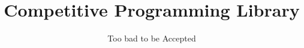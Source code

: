 \documentclass[a4paper]{article}
\title{Competitive Programming Library}
\author{Too bad to be Accepted}
\date{ }
\newcommand{\inculdeSubFile}[1]{\newpage}
\begin{document}
	\maketitle
	\tableofcontents
	\newpage

	\inculdeSubFile{DynamicProgramming/dp}
	\inculdeSubFile{BitManipulation/bm}
	\inculdeSubFile{Algorithms/algo}
	\inculdeSubFile{DataStructures/ds}
	\inculdeSubFile{GraphTheory/gt}
	
\end{document}

